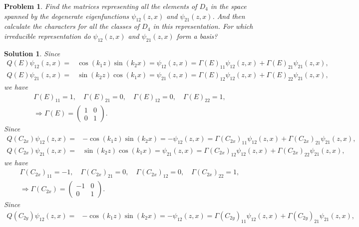 \documentclass[UTF8,10pt,a4paper]{article}
\theoremstyle{Problem}
\newtheorem{prob}{Problem}
\theoremstyle{Solution}
\newtheorem*{sol}{Solution}
\begin{document}
\begin{prob}
    Find the matrices representing all the elements of $D_4$ in the space spanned by the degenerate eigenfunctions $\psi_{12}(z,x)$ and $\psi_{21}(z,x)$. And then calculate the characters for all the classes of $D_4$ in this representation. For which irreducible representation do $\psi_{12}(z,x)$ and $\psi_{21}(z,x)$ form a basis?
\end{prob}
\begin{sol}
    Since
    \begin{align}
        Q(E)\psi_{12}(z,x)=&\cos(k_1z)\sin(k_2x)=\psi_{12}(z,x)=\Gamma(E)_{11}\psi_{12}(z,x)+\Gamma(E)_{21}\psi_{21}(z,x),\\
        Q(E)\psi_{21}(z,x)=&\sin(k_2z)\cos(k_1x)=\psi_{21}(z,x)=\Gamma(E)_{12}\psi_{12}(z,x)+\Gamma(E)_{22}\psi_{21}(z,x),
    \end{align}
    we have
    \begin{gather}
        \Gamma(E)_{11}=1,\quad\Gamma(E)_{21}=0,\quad\Gamma(E)_{12}=0,\quad\Gamma(E)_{22}=1,\\
        \Longrightarrow\Gamma(E)=\left(\begin{matrix}
            1&0\\
            0&1
        \end{matrix}\right).
    \end{gather}
    Since
    \begin{align}
        Q(C_{2x})\psi_{12}(z,x)=&-\cos(k_1z)\sin(k_2x)=-\psi_{12}(z,x)=\Gamma(C_{2x})_{11}\psi_{12}(z,x)+\Gamma(C_{2x})_{21}\psi_{21}(z,x),\\
        Q(C_{2x})\psi_{21}(z,x)=&\sin(k_2z)\cos(k_1x)=\psi_{21}(z,x)=\Gamma(C_{2x})_{12}\psi_{12}(z,x)+\Gamma(C_{2x})_{22}\psi_{21}(z,x),
    \end{align}
    we have
    \begin{gather}
        \Gamma(C_{2x})_{11}=-1,\quad\Gamma(C_{2x})_{21}=0,\quad\Gamma(C_{2x})_{12}=0,\quad\Gamma(C_{2x})_{22}=1,\\
        \Longrightarrow\Gamma(C_{2x})=\left(\begin{matrix}
            -1&0\\
            0&1
        \end{matrix}\right).
    \end{gather}
    Since
    \begin{align}
        Q(C_{2y})\psi_{12}(z,x)=&-\cos(k_1z)\sin(k_2x)=-\psi_{12}(z,x)=\Gamma(C_{2y})_{11}\psi_{12}(z,x)+\Gamma(C_{2y})_{21}\psi_{21}(z,x),\\

\end{align}
\end{sol}
\end{document}
